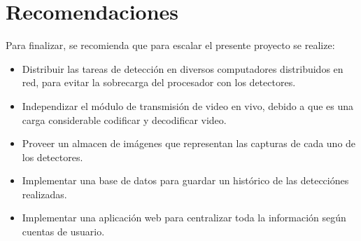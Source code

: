 \section{Recomendaciones}
Para finalizar, se recomienda que para escalar el presente proyecto se realize:
\begin{itemize}
    \item Distribuir las tareas de detección en diversos computadores distribuidos en red, para evitar la sobrecarga del procesador con los detectores.
    \item Independizar el módulo de transmisión de video en vivo, debido a que es una carga considerable codificar y decodificar video.
    \item Proveer un almacen de imágenes que representan las capturas de cada uno de los detectores.
    \item Implementar una base de datos para guardar un histórico de las detecciónes realizadas.
    \item Implementar una aplicación web para centralizar toda la información según cuentas de usuario. 
\end{itemize}

